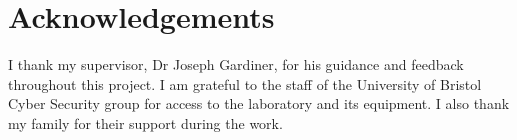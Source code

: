 \chapter*{Acknowledgements}
\noindent
I thank my supervisor, Dr Joseph Gardiner, for his guidance and feedback throughout this project. I am grateful to the staff of the University of Bristol Cyber Security group for access to the laboratory and its equipment. I also thank my family for their support during the work.
